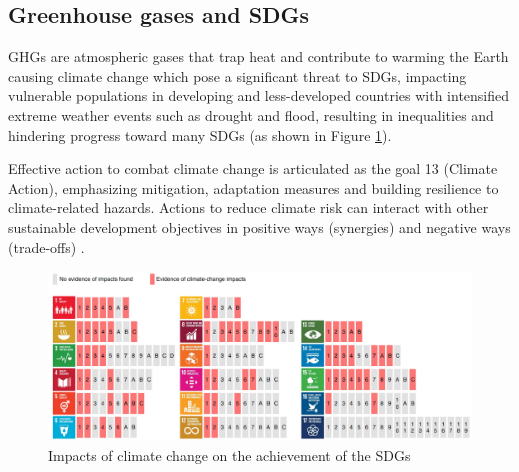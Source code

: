 \subsection{Greenhouse gases and SDGs}
GHGs are atmospheric gases that trap heat and contribute to warming the Earth causing climate change which pose a significant threat to SDGs, impacting vulnerable populations in developing and less-developed countries with intensified extreme weather events such as drought and flood, resulting in inequalities and hindering progress toward many SDGs (as shown in Figure \ref{fig:chap2_fig5}). \par
Effective action to combat climate change is articulated as the goal 13 (Climate Action), emphasizing mitigation, adaptation measures and building resilience to climate-related hazards. Actions to reduce climate risk can interact with other sustainable development objectives in positive ways (synergies) and negative ways (trade-offs) \citep{lee2023climate}. \par
\begin{figure}[tbh!]
    \centering
    \includegraphics[width=\textwidth]{figs/chap2/impact_cc_to_sdgs.png}
    \caption[Impacts of climate change on the achievement of the SDGs]{Impacts of climate change on the achievement of the SDGs \citep{fuso2019connecting}}
    \label{fig:chap2_fig5}
\end{figure}
